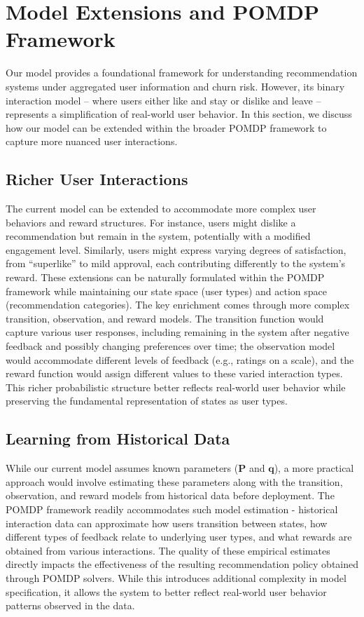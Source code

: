 \section{Model Extensions and POMDP Framework}
\label{sec:model-extensions}

Our model provides a foundational framework for understanding recommendation systems under aggregated user information and churn risk. However, its binary interaction model -- where users either like and stay or dislike and leave -- represents a simplification of real-world user behavior. In this section, we discuss how our model can be extended within the broader POMDP framework to capture more nuanced user interactions.

\subsection{Richer User Interactions}

The current model can be extended to accommodate more complex user behaviors and reward structures. For instance, users might dislike a recommendation but remain in the system, potentially with a modified engagement level. Similarly, users might express varying degrees of satisfaction, from ``superlike'' to mild approval, each contributing differently to the system's reward. These extensions can be naturally formulated within the POMDP framework while maintaining our state space (user types) and action space (recommendation categories). The key enrichment comes through more complex transition, observation, and reward models. The transition function would capture various user responses, including remaining in the system after negative feedback and possibly changing preferences over time; the observation model would accommodate different levels of feedback (e.g., ratings on a scale), and the reward function would assign different values to these varied interaction types. This richer probabilistic structure better reflects real-world user behavior while preserving the fundamental representation of states as user types.

\subsection{Learning from Historical Data}

While our current model assumes known parameters ($\mathbf{P}$ and $\mathbf{q}$), a more practical approach would involve estimating these parameters along with the transition, observation, and reward models from historical data before deployment. The POMDP framework readily accommodates such model estimation - historical interaction data can approximate how users transition between states, how different types of feedback relate to underlying user types, and what rewards are obtained from various interactions. The quality of these empirical estimates directly impacts the effectiveness of the resulting recommendation policy obtained through POMDP solvers. While this introduces additional complexity in model specification, it allows the system to better reflect real-world user behavior patterns observed in the data.

